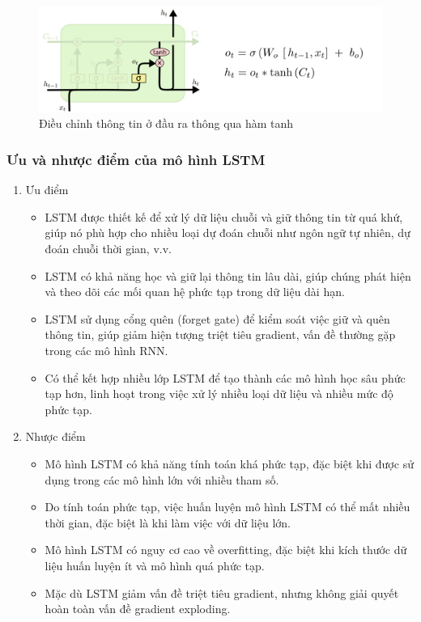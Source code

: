  \begin{figure}[H]
    \centering
    \includegraphics[width=14cm]{Images/Architecture/LSTM3-focus-o.png}
\caption{Điều chỉnh thông tin ở đầu ra thông qua hàm tanh}
\end{figure}
\subsubsection{Ưu và nhược điểm của mô hình LSTM}

\begin{enumerate}[-]
    \item Ưu điểm
    \begin{itemize}
        \item LSTM được thiết kế để xử lý dữ liệu chuỗi và giữ thông tin từ quá khứ, giúp nó phù hợp cho nhiều loại dự đoán chuỗi như ngôn ngữ tự nhiên, dự đoán chuỗi thời gian, v.v.
        \item LSTM có khả năng học và giữ lại thông tin lâu dài, giúp chúng phát hiện và theo dõi các mối quan hệ phức tạp trong dữ liệu dài hạn.
        \item LSTM sử dụng cổng quên (forget gate) để kiểm soát việc giữ và quên thông tin, giúp giảm hiện tượng triệt tiêu gradient, vấn đề thường gặp trong các mô hình RNN.
        \item Có thể kết hợp nhiều lớp LSTM để tạo thành các mô hình học sâu phức tạp hơn, linh hoạt trong việc xử lý nhiều loại dữ liệu và nhiều mức độ phức tạp.
    \end{itemize}
    \item  Nhược điểm
    \begin{itemize}
        \item Mô hình LSTM có khả năng tính toán khá phức tạp, đặc biệt khi được sử dụng trong các mô hình lớn với nhiều tham số.
        \item Do tính toán phức tạp, việc huấn luyện mô hình LSTM có thể mất nhiều thời gian, đặc biệt là khi làm việc với dữ liệu lớn.
        \item Mô hình LSTM có nguy cơ cao về overfitting, đặc biệt khi kích thước dữ liệu huấn luyện ít và mô hình quá phức tạp.
        \item Mặc dù LSTM giảm vấn đề triệt tiêu gradient, nhưng không giải quyết hoàn toàn vấn đề gradient exploding.
    \end{itemize}
\end{enumerate}
